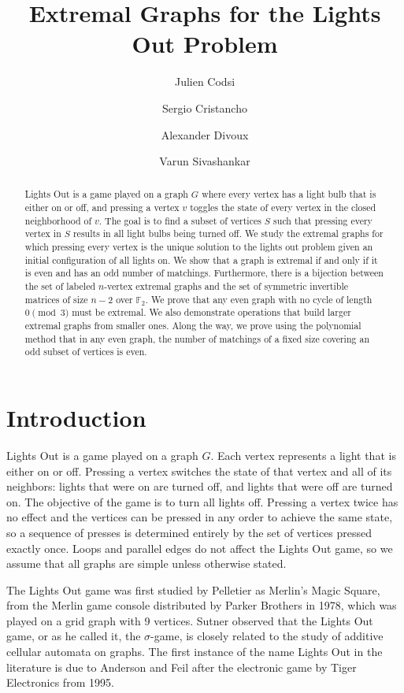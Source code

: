 \documentclass{amsart}
\title{Extremal Graphs for the Lights Out Problem}
\author{Julien Codsi}
\author{Sergio Cristancho}
\author{Alexander Divoux}
\author{Varun Sivashankar}
\theoremstyle{definition}
\theoremstyle{remark}
\def\FF{\mathbb{F}}
\begin{document}
\maketitle

\begin{abstract}
Lights Out is a game played on a graph $G$ where every vertex has a light bulb that is either on or off, and pressing a vertex $v$ toggles the state of every vertex in the closed neighborhood of $v$. The goal is to find a subset of vertices $S$ such that pressing every vertex in $S$ results in all light bulbs being turned off. We study the extremal graphs for which pressing every vertex is the unique solution to the lights out problem given an initial configuration of all lights on. We show that a graph is extremal if and only if it is even and has an odd number of matchings. Furthermore, there is a bijection between the set of labeled $n$-vertex extremal graphs and the set of symmetric invertible matrices of size $n-2$ over $\FF_2$. We prove that any even graph with no cycle of length $0\pmod 3$ must be extremal. We also demonstrate operations that build larger extremal graphs from smaller ones. Along the way, we prove using the polynomial method that in any even graph, the number of matchings of a fixed size covering an odd subset of vertices is even.
\end{abstract}

\section{Introduction}

Lights Out is a game played on a graph $G$. Each vertex represents a light that is either on or off. Pressing a vertex switches the state of that vertex and all of its neighbors: lights that were on are turned off, and lights that were off are turned on. The objective of the game is to turn all lights off. Pressing a vertex twice has no effect and the vertices can be pressed in any order to achieve the same state, so a sequence of presses is determined entirely by the set of vertices pressed exactly once. Loops and parallel edges do not affect the Lights Out game, so we assume that all graphs are simple unless otherwise stated.

The Lights Out game was first studied by Pelletier \cite{Pelletier87} as Merlin's Magic Square, from the Merlin game console distributed by Parker Brothers in 1978, which was played on a grid graph with 9 vertices. Sutner \cite{Sutner89} \cite{Sutner90} observed that the Lights Out game, or as he called it, the $\sigma$-game, is closely related to the study of additive cellular automata on graphs. The first instance of the name Lights Out in the literature is due to Anderson and Feil \cite{anderson1998turning} after the electronic game by Tiger Electronics from 1995. 
\end{document}
